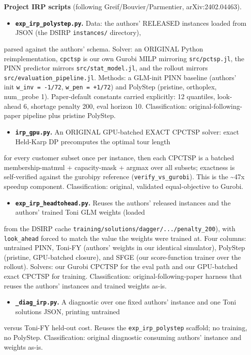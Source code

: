 \documentclass[10pt]{article}
\begin{document}
\textbf{Project IRP scripts} (following Greif/Bouvier/Parmentier, arXiv:2402.04463).
\begin{itemize}\setlength{\itemsep}{2pt}
\item \textbf{\texttt{exp\_irp\_polystep.py}.} Data: the authors' RELEASED instances loaded from JSON (the DSIRP \texttt{instances/} directory),
\end{itemize}
  parsed against the authors' schema. Solver: an ORIGINAL Python reimplementation, \texttt{cpctsp} is our own Gurobi MILP
  mirroring \texttt{src/pctsp.jl}, the PINN predictor mirrors \texttt{src/stat\_model.jl}, and the rollout mirrors
  \texttt{src/evaluation\_pipeline.jl}. Methods: a GLM-init PINN baseline (authors' init \texttt{w\_inv = -1/72}, \texttt{w\_pen = +1/72}) and
  PolyStep (pristine, orthoplex, num\_probe 1). Paper-default constants carried explicitly: 12 quantiles, look-ahead 6,
  shortage penalty 200, eval horizon 10. Classification: original-following-paper pipeline plus pristine PolyStep.
\begin{itemize}\setlength{\itemsep}{2pt}
\item \textbf{\texttt{irp\_gpu.py}.} An ORIGINAL GPU-batched EXACT CPCTSP solver: exact Held-Karp DP precomputes the optimal tour length
\end{itemize}
  for every customer subset once per instance, then each CPCTSP is a batched membership-matmul + capacity-mask + argmax
  over all subsets; exactness is self-verified against the gurobipy reference (\texttt{verify\_vs\_gurobi}). This is the \textasciitilde{}47x
  speedup component. Classification: original, validated equal-objective to Gurobi.
\begin{itemize}\setlength{\itemsep}{2pt}
\item \textbf{\texttt{exp\_irp\_headtohead.py}.} Reuses the authors' released instances and the authors' trained Toni GLM weights (loaded
\end{itemize}
  from the DSIRP cache \texttt{training/solutions/dagger/.../penalty\_200}), with \texttt{look\_ahead} forced to match the value the
  weights were trained at. Four columns: untrained PINN, Toni-FY (authors' weights in our identical simulator), PolyStep
  (pristine, GPU-batched closure), and SFGE (our score-function trainer over the rollout). Solvers: our Gurobi CPCTSP
  for the eval path and our GPU-batched exact CPCTSP for training. Classification: original-following-paper harness that
  reuses the authors' instances and trained weights as-is.
\begin{itemize}\setlength{\itemsep}{2pt}
\item \textbf{\texttt{\_diag\_irp.py}.} A diagnostic over one fixed authors' instance and one Toni solutions JSON, printing untrained
\end{itemize}
  versus Toni-FY held-out cost. Reuses the \texttt{exp\_irp\_polystep} scaffold; no training, no PolyStep. Classification:
  original diagnostic consuming authors' instance and weights as-is.
\end{document}
